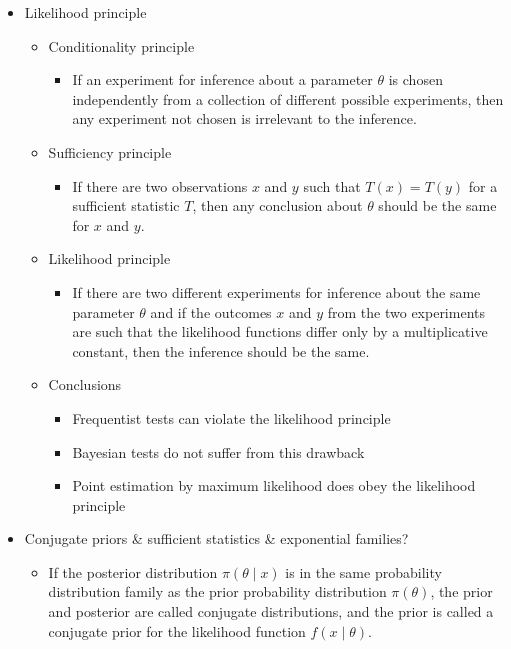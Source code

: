 \documentclass[a4paper]{article}
\begin{document}
\begin{itemize}
\begin{itemize}
\begin{itemize}
        \end{itemize}
    \end{itemize}
    \item Likelihood principle
    \begin{itemize}
        \item Conditionality principle
        \begin{itemize}
            \item If an experiment for inference about a parameter $\theta$ is chosen independently from a collection of different possible experiments, then any experiment not chosen is irrelevant to the inference.
        \end{itemize}
        \item Sufficiency principle
        \begin{itemize}
            \item If there are two observations $x$ and $y$ such that $T(x)=T(y)$ for a sufficient statistic $T$, then any conclusion about $\theta$ should be the same for $x$ and $y$.
        \end{itemize}
        \item Likelihood principle
        \begin{itemize}
            \item If there are two different experiments for inference about the same parameter $\theta$ and if the outcomes $x$ and $y$ from the two experiments are such that the likelihood functions differ only by a multiplicative constant, then the inference should be the same.
        \end{itemize}
        \item Conclusions
        \begin{itemize}
            \item Frequentist tests can violate the likelihood principle
            \item Bayesian tests do not suffer from this drawback
            \item Point estimation by maximum likelihood does obey the likelihood principle
        \end{itemize}
    \end{itemize}
    \item Conjugate priors \& sufficient statistics \& exponential families?
    \begin{itemize}
        \item If the posterior distribution $\pi(\theta\mid x)$ is in the same probability distribution family as the prior probability distribution $\pi(\theta)$, the prior and posterior are called conjugate distributions, and the prior is called a conjugate prior for the likelihood function $f(x\mid\theta)$.

\end{itemize}
\end{itemize}
\end{document}
